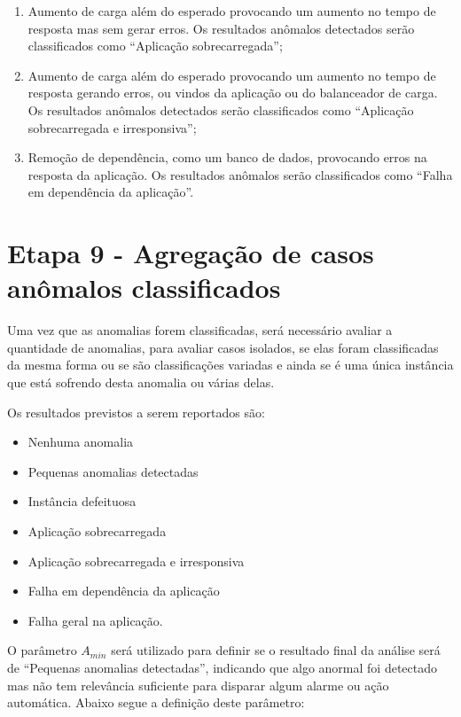 \begin{enumerate}
  \item Aumento de carga além do esperado provocando um aumento no tempo de
        resposta mas sem gerar erros. Os resultados anômalos detectados serão
		classificados como ``Aplicação sobrecarregada'';
  \item Aumento de carga além do esperado provocando um aumento no tempo de
        resposta gerando erros, ou vindos da aplicação ou do balanceador de carga.
		Os resultados anômalos detectados serão classificados como ``Aplicação
		sobrecarregada e irresponsiva'';
  \item Remoção de dependência, como um banco de dados, provocando erros na resposta
        da aplicação. Os resultados anômalos serão classificados como ``Falha em
		dependência da aplicação''.
\end{enumerate}


\section{Etapa 9 - Agregação de casos anômalos classificados}
\label{sec:etapa-9}

Uma vez que as anomalias forem classificadas, será necessário avaliar a quantidade
de anomalias, para avaliar casos isolados, se elas foram classificadas da mesma
forma ou se são classificações variadas e ainda se é uma única instância que está
sofrendo desta anomalia ou várias delas.

Os resultados previstos a serem reportados são:

\begin{itemize}
  \item Nenhuma anomalia
  \item Pequenas anomalias detectadas
  \item Instância defeituosa
  \item Aplicação sobrecarregada
  \item Aplicação sobrecarregada e irresponsiva
  \item Falha em dependência da aplicação
  \item Falha geral na aplicação.
\end{itemize}

O parâmetro $A_{min}$ será utilizado para definir se o resultado final da análise
será de ``Pequenas anomalias detectadas'', indicando que algo anormal foi detectado
mas não tem relevância suficiente para disparar algum alarme ou ação automática.
Abaixo segue a definição deste parâmetro:

